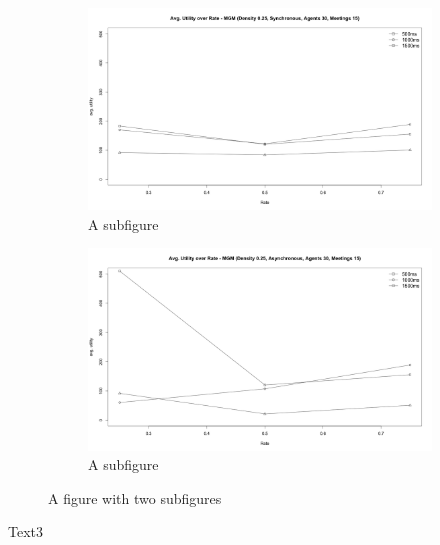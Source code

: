 \begin{figure}[H]
\centering
\begin{subfigure}{0.5\textwidth}
  \centering
  \includegraphics[width=1\linewidth]{graphics/experiments/dynamic/d_4.png}
  \caption{A subfigure}
  \label{fig:sub1}
\end{subfigure}%
\begin{subfigure}{0.5\textwidth}
  \centering
  \includegraphics[width=1\linewidth]{graphics/experiments/dynamic/d_5.png}
  \caption{A subfigure}
  \label{fig:sub2}
\end{subfigure}
\caption{A figure with two subfigures}
\label{fig:test}
\end{figure}

Text3




